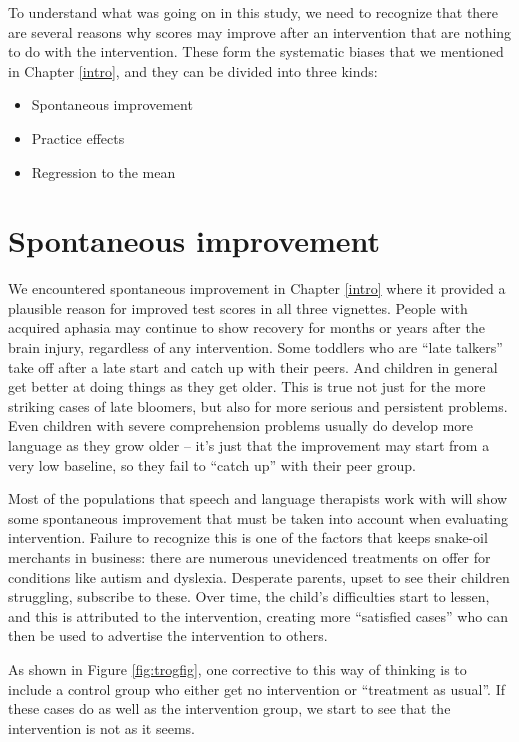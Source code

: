 \documentclass{krantz}
\providecommand{\tightlist}{%
\setlength{\itemsep}{0pt}\setlength{\parskip}{0pt}}
\begin{document}
To understand what was going on in this study, we need to recognize that there are several reasons why scores may improve after an intervention that are nothing to do with the intervention. These form the systematic biases that we mentioned in Chapter \ref{intro}, and they can be divided into three kinds:

\begin{itemize}
\tightlist
\item
  Spontaneous improvement
\item
  Practice effects
\item
  Regression to the mean
\end{itemize}

\hypertarget{spontaneous-improvement}{%
\section{Spontaneous improvement}\label{spontaneous-improvement}}

We encountered spontaneous improvement in Chapter \ref{intro} where it provided a plausible reason for improved test scores in all three vignettes. People with acquired aphasia may continue to show recovery for months or years after the brain injury, regardless of any intervention. Some toddlers who are ``late talkers'' take off after a late start and catch up with their peers. And children in general get better at doing things as they get older. This is true not just for the more striking cases of late bloomers, but also for more serious and persistent problems. Even children with severe comprehension problems usually do develop more language as they grow older -- it's just that the improvement may start from a very low baseline, so they fail to ``catch up'' with their peer group.

Most of the populations that speech and language therapists work with will show some spontaneous improvement that must be taken into account when evaluating intervention. Failure to recognize this is one of the factors that keeps snake-oil merchants in business: there are numerous unevidenced treatments on offer for conditions like autism and dyslexia. Desperate parents, upset to see their children struggling, subscribe to these. Over time, the child's difficulties start to lessen, and this is attributed to the intervention, creating more ``satisfied cases'' who can then be used to advertise the intervention to others.

As shown in Figure \ref{fig:trogfig}, one corrective to this way of thinking is to include a control group who either get no intervention or ``treatment as usual''. If these cases do as well as the intervention group, we start to see that the intervention is not as it seems.
\end{document}
